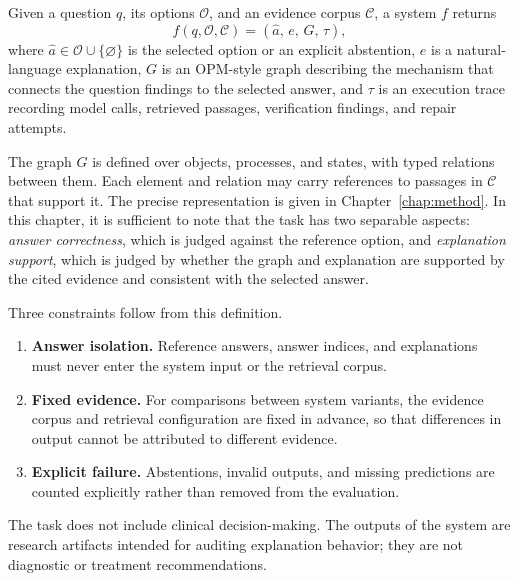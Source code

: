 \begin{definition}
\label{def:task}
Given a question $q$, its options $\mathcal{O}$, and an evidence corpus $\mathcal{C}$, a system $f$ returns
\begin{equation}
  f(q, \mathcal{O}, \mathcal{C}) = (\hat{a},\, e,\, G,\, \tau),
  \label{eq:task_output}
\end{equation}
where $\hat{a} \in \mathcal{O} \cup \{\varnothing\}$ is the selected option or an explicit abstention, $e$ is a natural-language explanation, $G$ is an OPM-style graph describing the mechanism that connects the question findings to the selected answer, and $\tau$ is an execution trace recording model calls, retrieved passages, verification findings, and repair attempts.
\end{definition}

The graph $G$ is defined over objects, processes, and states, with typed relations between them. Each element and relation may carry references to passages in $\mathcal{C}$ that support it. The precise representation is given in Chapter~\ref{chap:method}. In this chapter, it is sufficient to note that the task has two separable aspects: \emph{answer correctness}, which is judged against the reference option, and \emph{explanation support}, which is judged by whether the graph and explanation are supported by the cited evidence and consistent with the selected answer.

Three constraints follow from this definition.
\begin{enumerate}[label=(\roman*)]
  \item \textbf{Answer isolation.} Reference answers, answer indices, and explanations must never enter the system input or the retrieval corpus.
  \item \textbf{Fixed evidence.} For comparisons between system variants, the evidence corpus and retrieval configuration are fixed in advance, so that differences in output cannot be attributed to different evidence.
  \item \textbf{Explicit failure.} Abstentions, invalid outputs, and missing predictions are counted explicitly rather than removed from the evaluation.
\end{enumerate}

The task does not include clinical decision-making. The outputs of the system are research artifacts intended for auditing explanation behavior; they are not diagnostic or treatment recommendations.

